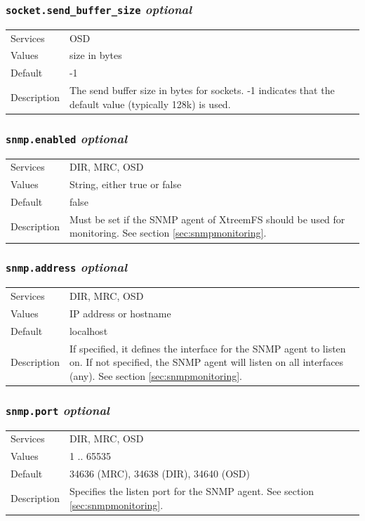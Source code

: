 \documentclass[a4paper,10pt]{book}
\begin{document}
\subsubsection{\texttt{socket.send\_buffer\_size} \textit{optional}}
\begin{tabular}{lp{10cm}}
 Services & OSD\\
 Values   & size in bytes\\
 Default  & -1 \\
 Description & The send buffer size in bytes for sockets. -1 indicates that the default value (typically 128k) is used.
\end{tabular}

\subsubsection{\texttt{snmp.enabled} \textit{optional}}
\begin{tabular}{lp{10cm}}
 Services & DIR, MRC, OSD\\
 Values   & String, either true or false \\
 Default  & false\\
 Description & Must be set if the SNMP agent of XtreemFS should be used for monitoring. See section \ref{sec:snmpmonitoring}.
\end{tabular}

\subsubsection{\texttt{snmp.address} \textit{optional}}
\begin{tabular}{lp{10cm}}
 Services & DIR, MRC, OSD\\
 Values   & IP address or hostname \\
 Default  & localhost \\
 Description & If specified, it defines the interface for the SNMP agent to listen on. If not specified, the SNMP agent will listen on all interfaces (any). See section \ref{sec:snmpmonitoring}.
\end{tabular}

\subsubsection{\texttt{snmp.port} \textit{optional}}
\begin{tabular}{lp{10cm}}
 Services & DIR, MRC, OSD\\
 Values   & 1 .. 65535\\
 Default  & 34636 (MRC), 34638 (DIR), 34640 (OSD)\\
 Description & Specifies the listen port for the SNMP agent. See section \ref{sec:snmpmonitoring}.
\end{tabular}
\end{document}

